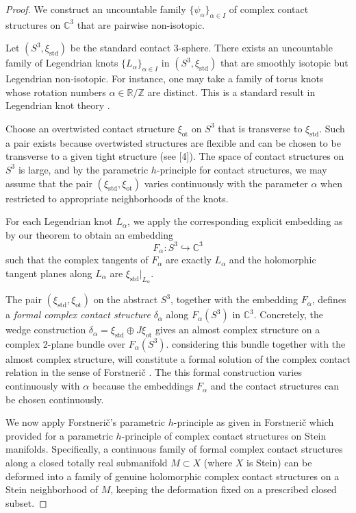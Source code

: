 \documentclass[10pt,a4paper]{amsart}
\begin{document}
\begin{proof}
We construct an uncountable family $\{\psi_\alpha\}_{\alpha\in I}$ of complex contact structures on $\mathbb{C}^3$ that are pairwise non-isotopic.

\medskip
Let $(S^3,\xi_{\mathrm{std}})$ be the standard contact 3-sphere. 
There exists an uncountable family of Legendrian knots $\{L_\alpha\}_{\alpha\in I}$ in $(S^3,\xi_{\mathrm{std}})$ 
that are smoothly isotopic but Legendrian non-isotopic. 
For instance, one may take a family of torus knots whose rotation numbers $\alpha\in\mathbb{R}/\mathbb{Z}$ 
are distinct. This is a standard result in Legendrian knot theory \cite{EtnyreHonda2001}.

\medskip
Choose an overtwisted contact structure $\xi_{\mathrm{ot}}$ on $S^3$ that is transverse to $\xi_{\mathrm{std}}$. 
Such a pair exists because overtwisted structures are flexible and can be chosen to be transverse to a given tight structure (see [4]). 
The space of contact structures on $S^3$ is large, and by the parametric $h$-principle for contact structures, 
we may assume that the pair $(\xi_{\mathrm{std}},\xi_{\mathrm{ot}})$ varies continuously with the parameter $\alpha$ 
when restricted to appropriate neighborhoods of the knots.

\medskip
For each Legendrian knot $L_\alpha$, we apply the corresponding explicit embedding as by our theorem \cite{Elgindi2025} to obtain an embedding
\[
F_\alpha: S^3 \hookrightarrow \mathbb{C}^3
\]
such that the complex tangents of $F_\alpha$ are exactly $L_\alpha$ and the holomorphic tangent planes along $L_\alpha$ 
are $\xi_{\mathrm{std}}|_{L_\alpha}$.

The pair $(\xi_{\mathrm{std}},\xi_{\mathrm{ot}})$ on the abstract $S^3$, together with the embedding $F_\alpha$, 
defines a \emph{formal complex contact structure} $\delta_\alpha$ along $F_\alpha(S^3)$ in $\mathbb{C}^3$. 
Concretely, the wedge construction $\delta_\alpha = \xi_{\mathrm{std}} \oplus J\xi_{\mathrm{ot}}$ gives an almost complex structure 
on a complex 2-plane bundle over $F_\alpha(S^3)$. considering this bundle together with the almost complex structure, will
constitute a formal solution of the complex contact relation in the sense of Forstnerič \cite{Forstneric2020}. 
The this formal construction varies continuously with $\alpha$ because the embeddings $F_\alpha$ and the contact structures can be chosen continuously.

\medskip
We now apply Forstnerič's parametric $h$-principle as given in Forstnerič \cite{Forstneric2020} which provided for a parametric $h$-principle of complex contact structures on Stein manifolds. 
Specifically, a continuous family of formal complex contact structures along a closed totally real submanifold $M\subset X$ 
(where $X$ is Stein) can be deformed into a family of genuine holomorphic complex contact structures on a Stein neighborhood of $M$, 
keeping the deformation fixed on a prescribed closed subset.


\end{proof}
\end{document}
